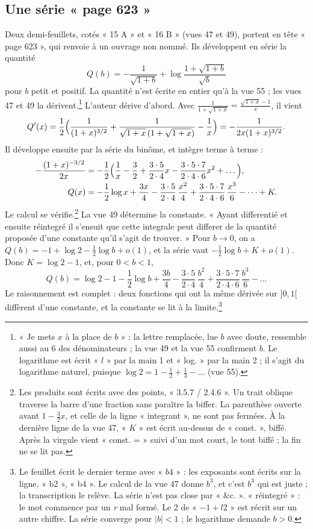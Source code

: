 \documentclass[11pt,a4paper]{article}
\begin{document}
\subsection*{Une série « page 623 »}

Deux demi-feuillets, cotés « 15 A » et « 16 B » (vues 47 et 49), portent en tête
« page 623 », qui renvoie à un ouvrage non nommé. Ils développent en série la
quantité
\[
Q(b)=-\frac1{\sqrt{1+b}}+\log\frac{1+\sqrt{1+b}}{\sqrt b}
\]
pour \(b\) petit et positif. La quantité n'est écrite en entier qu'à la vue 55 ;
les vues 47 et 49 la dérivent.\footnote{« Je mets \(x\) à la place de \(b\) » :
la lettre remplacée, lue \(b\) avec doute, ressemble aussi au 6 des
dénominateurs ; la vue 49 et la vue 55 confirment \(b\). Le logarithme est
écrit « \(l\) » par la main 1 et « log. » par la main 2 ; il s'agit du
logarithme naturel, puisque \(\log2=1-\frac12+\frac13-\dots\) (vue 55).}
L'auteur dérive d'abord. Avec \(\frac{1}{1+\sqrt{1+x}}=\frac{\sqrt{1+x}-1}{x}\),
il vient
\[
Q'(x)=\frac12\Bigl(\frac{1}{(1+x)^{3/2}}+\frac{1}{\sqrt{1+x}\,(1+\sqrt{1+x})}-\frac1x\Bigr)
=-\frac{1}{2x(1+x)^{3/2}} .
\]
Il développe ensuite par la série du binôme, et intègre terme à terme :
\[
\begin{aligned}
-\frac{(1+x)^{-3/2}}{2x}&=-\frac12\Bigl(\frac1x-\frac32+\frac{3\cdot5}{2\cdot4}x-\frac{3\cdot5\cdot7}{2\cdot4\cdot6}x^2+\dots\Bigr),\\
Q(x)&=-\frac12\log x+\frac{3x}{4}-\frac{3\cdot5}{2\cdot4}\,\frac{x^2}{4}+\frac{3\cdot5\cdot7}{2\cdot4\cdot6}\,\frac{x^3}{6}-\dots+K .
\end{aligned}
\]
Le calcul se vérifie.\footnote{Les produits sont écrits avec des points,
« 3.5.7 / 2.4.6 ». Un trait oblique traverse la barre d'une fraction sans
paraître la biffer. La parenthèse ouverte avant \(1-\frac32x\), et celle de
la ligne « integrant », ne sont pas fermées. À la dernière ligne de la vue 47,
« \(K\) » est écrit au-dessus de « const. », biffé. Après la virgule vient
« const. = » suivi d'un mot court, le tout biffé ; la fin ne se lit pas.} La
vue 49 détermine la constante. « Ayant differentié et ensuite réintegré il
s'ensuit que cette integrale peut differer de la quantité proposée d'une
constante qu'il s'agit de trouver. » Pour \(b\to0\), on a
\(Q(b)=-1+\log2-\frac12\log b+o(1)\), et la série vaut \(-\frac12\log b+K+o(1)\).
Donc \(K=\log2-1\), et, pour \(0<b<1\),
\[
Q(b)=\log2-1-\frac12\log b+\frac{3b}{4}-\frac{3\cdot5}{2\cdot4}\,\frac{b^2}{4}+\frac{3\cdot5\cdot7}{2\cdot4\cdot6}\,\frac{b^3}{6}-\dots
\]
Le raisonnement est complet : deux fonctions qui ont la même dérivée sur
\(]0,1[\) diffèrent d'une constante, et la constante se lit à la
limite.\footnote{Le feuillet écrit le dernier terme avec « \(b4\) » : les
exposants sont écrits sur la ligne, « b2 », « b4 ». Le calcul de la vue 47 donne
\(b^3\), et c'est \(b^3\) qui est juste ; la transcription le relève. La série
n'est pas close par « \&c. ». « réintegré » : le mot commence par un \emph{r}
mal formé. Le 2 de « \(-1+l2\) » est récrit sur un autre chiffre. La série
converge pour \(|b|<1\) ; le logarithme demande \(b>0\).}
\end{document}
